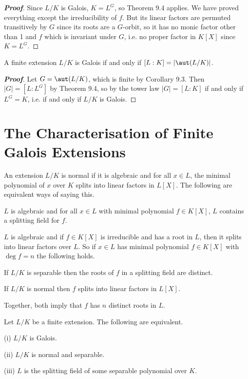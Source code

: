 \begin{proof}[\bf Proof]
Since $L/K$ is Galois, $K = L^G$, so Theorem 9.4 applies. We have proved everything except the irreducibility of $f$. But its linear factors are permuted transitively by $G$ since its roots are a $G$-orbit, so it has no monic factor other than 1 and $f$ which is invariant under $G$, i.e. no proper factor in $K[X]$ since $K = L^G$.
\end{proof}

\begin{corollary}
A finite extension $L/K$ is Galois if and only if $[L : K] = |\aut(L/K)|$.
\end{corollary}

\begin{proof}[\bf Proof]
Let $G = \aut(L/K)$, which is finite by Corollary 9.3. Then $|G| = [L : L^G]$ by Theorem 9.4, so by the tower law $|G| = [L : K]$ if and only if $L^G = K$, i.e. if and only if $L/K$ is Galois.
\end{proof}

\section{The Characterisation of Finite Galois Extensions}

\begin{definition}
An extension $L/K$ is normal if it is algebraic and for all $x \in L$, the minimal polynomial of $x$ over $K$ splits into linear factors in $L[X]$.
The following are equivalent ways of saying this.
\bit
\item $L$ is algebraic and for all $x \in L$ with minimal polynomial $f \in K[X]$, $L$ contains a splitting field for $f$.
\item $L$ is algebraic and if $f \in K[X]$ is irreducible and has a root in $L$, then it splits into linear factors over $L$.
\eit
So if $x \in L$ has minimal polynomial $f \in K[X]$ with $\deg f = n$ the following holds.
\bit
\item If $L/K$ is separable then the roots of $f$ in a splitting field are distinct.
\item If $L/K$ is normal then $f$ splits into linear factors in $L[X]$.
\eit

Together, both imply that $f$ has $n$ distinct roots in $L$.
\end{definition}

\begin{theorem}
Let $L/K$ be a finite extension. The following are equivalent.
\ben
\item [(i)] $L/K$ is Galois.
\item [(ii)] $L/K$ is normal and separable.
\item [(iii)] $L$ is the splitting field of some separable polynomial over $K$.
\een
\end{theorem}


